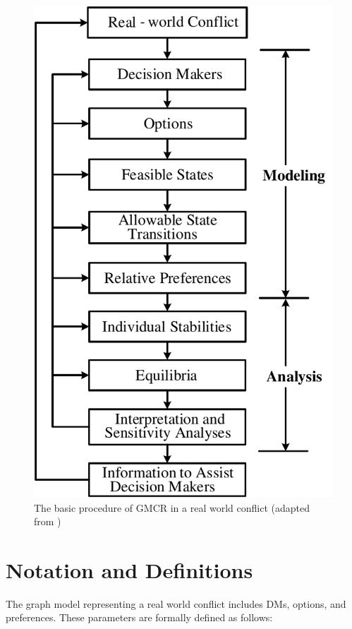 \documentclass[letterpaper,12pt,titlepage,oneside,final]{book}
\begin{document}
\begin{center}
\begin{figure}[h!]
\centering
\includegraphics[scale=0.65]{PDF-IMG/GMCR_pro.pdf}

\caption{The basic procedure of GMCR in a real world conflict (adapted from \citet{fang1993})}

\label{fig:procedure_or}
\end{figure}
\end{center}

\section{Notation and Definitions}
The graph model representing a real world conflict includes DMs, options, and preferences. These parameters are formally defined as follows:
\end{document}
